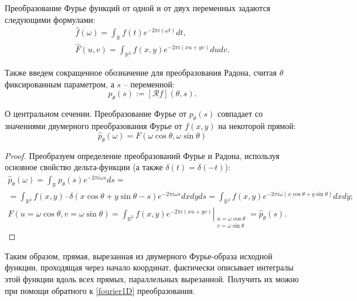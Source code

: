 
Преобразование Фурье функций от одной и от двух переменных задаются следующими формулами:
\begin{gather}
\label{fourier1D}
    \hat{f}(\omega) = \int_{\mathbb{R}} f(t) e^{-2\pi i (\omega t)} dt,\\
\label{fourier2D}
    \hat{F}(u, v) = \int_{\mathbb{R}^2} f(x, y) e^{-2\pi i (xu + yv)} du dv.
\end{gather}

Также введем сокращенное обозначение для преобразования Радона, считая $\theta$ фиксированным параметром, а $s$ -- переменной:
\begin{equation*}
    p_\theta(s) := \left[ \mathcal{R}f \right]\left( \theta, s \right).
\end{equation*}

\begin{theorem}{О центральном сечении.}
    Преобразование Фурье от $p_\theta(s)$ совпадает со значениями двумерного преобразования Фурье от $f(x, y)$ на некоторой прямой:
    \begin{equation*}
        \hat{p}_\theta(\omega) = F(\omega\cos\theta, \omega\sin\theta)
    \end{equation*}
\end{theorem}
\begin{proof}
    Преобразуем определение преобразований Фурье и Радона, используя основное свойство дельта-функции (а также $\delta(t) = \delta(-t)$):
    \begin{gather*}
        \hat{p}_\theta(\omega) =
        \int_{\mathbb{R}} p_\theta(s) e^{-2\pi i \omega s} ds =\\=
        \int_{\mathbb{R}^3} f(x, y) \cdot \delta(x\cos\theta + y\sin\theta - s) e^{-2\pi i \omega s} dx dy ds =
        \int_{\mathbb{R}^2} f(x, y) e^{-2\pi i \omega \left( x\cos\theta + y\sin\theta \right)} dx dy;\\
        F(u=\omega\cos\theta, v=\omega\sin\theta) =
        \left.\int_{\mathbb{R}^2} f(x, y) e^{-2\pi i \left( x u + y v \right)}\right|_{\substack{u=\omega\cos\theta\\v=\omega\sin\theta}} =
        \hat{p}_\theta(s).
    \end{gather*}
\end{proof}

Таким образом, прямая, вырезанная из двумерного Фурье-образа исходной функции, проходящая через начало координат, фактически описывает интегралы этой функции вдоль всех прямых, параллельных вырезанной. Получить их можно при помощи обратного к \eqref{fourier1D} преобразования.
